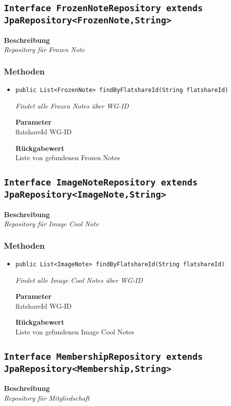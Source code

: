     \subsection{\texttt{Interface FrozenNoteRepository extends JpaRepository<FrozenNote,String>}}
    \textbf{Beschreibung} \\
    \textit{Repository für Frozen Note}
    \subsubsection{Methoden}
    \begin{itemize}
    	\item{\texttt{public List<FrozenNote> findByFlatshareId(String flatshareId)}}
    	
    	\textit{Findet alle Frozen Notes über WG-ID}
    	
    	\textbf{Parameter} \\
    	flatshareId WG-ID
    	
    	\textbf{Rückgabewert} \\
    	Liste von gefundenen Frozen Notes
    \end{itemize}
    \subsection{\texttt{Interface ImageNoteRepository extends JpaRepository<ImageNote,String>}}
    \textbf{Beschreibung} \\
    \textit{Repository für Image Cool Note}
    \subsubsection{Methoden}
    \begin{itemize}
    	\item{\texttt{public List<ImageNote> findByFlatshareId(String flatshareId)}}
    	
    	\textit{Findet alle Image Cool Notes über WG-ID}
    	
    	\textbf{Parameter} \\
    	flatshareId WG-ID
    	
    	\textbf{Rückgabewert} \\
    	Liste von gefundenen Image Cool Notes
    \end{itemize}
    \subsection{\texttt{Interface MembershipRepository extends JpaRepository<Membership,String>}}
    \textbf{Beschreibung} \\
    \textit{Repository für Mitgliedschaft}

